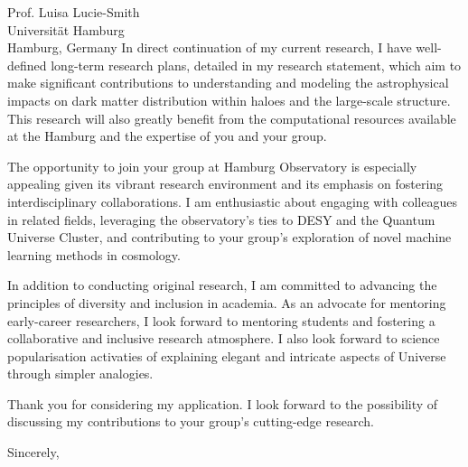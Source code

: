 \documentclass[11pt]{letter}
\begin{document}
\begin{letter}{Prof. Luisa Lucie-Smith \\ Universität Hamburg \\ Hamburg, Germany}
In direct continuation of my current research, I have well-defined long-term research plans, detailed in my research statement, which aim to make significant contributions to understanding and modeling the astrophysical impacts on dark matter distribution within haloes and the large-scale structure. This research will also greatly benefit from the computational resources available at the Hamburg and the expertise of you and your group.

The opportunity to join your group at Hamburg Observatory is especially appealing given its vibrant research environment and its emphasis on fostering interdisciplinary collaborations. I am enthusiastic about engaging with colleagues in related fields, leveraging the observatory's ties to DESY and the Quantum Universe Cluster, and contributing to your group's exploration of novel machine learning methods in cosmology.

In addition to conducting original research, I am committed to advancing the principles of diversity and inclusion in academia. As an advocate for mentoring early-career researchers, I look forward to mentoring students and fostering a collaborative and inclusive research atmosphere. I also look forward to science popularisation activaties of explaining elegant and intricate aspects of Universe through simpler analogies.

Thank you for considering my application. I look forward to the possibility of discussing my contributions to your group's cutting-edge research. 

\closing{Sincerely,}

\end{letter}
\end{document}
